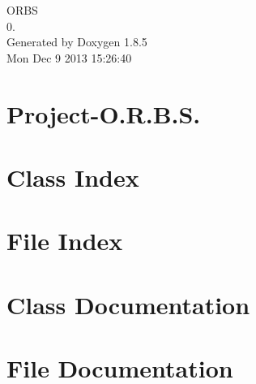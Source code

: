 \documentclass[twoside]{book}
\newcommand{\clearemptydoublepage}{%
  \newpage{\pagestyle{empty}\cleardoublepage}%
}
\begin{document}
\hypersetup{pageanchor=false}
\begin{titlepage}
\vspace*{7cm}
\begin{center}%
{\Large O\-R\-B\-S \\[1ex]\large 0. }\\
\vspace*{1cm}
{\large Generated by Doxygen 1.8.5}\\
\vspace*{0.5cm}
{\small Mon Dec 9 2013 15:26:40}\\
\end{center}
\end{titlepage}
\clearemptydoublepage
\tableofcontents
\clearemptydoublepage
{}
\hypersetup{pageanchor=true}

\chapter{Project-\/\-O.R.\-B.\-S.}
\label{md__c_1__users__marco__workspace__git_hub__o_r_b_s__project-_o_8_r_8_b_8_s_readme}
\hypertarget{md__c_1__users__marco__workspace__git_hub__o_r_b_s__project-_o_8_r_8_b_8_s_readme}{}

\chapter{Class Index}

\chapter{File Index}

\chapter{Class Documentation}





\chapter{File Documentation}








\newpage
{}
{}
\printindex
\end{document}
